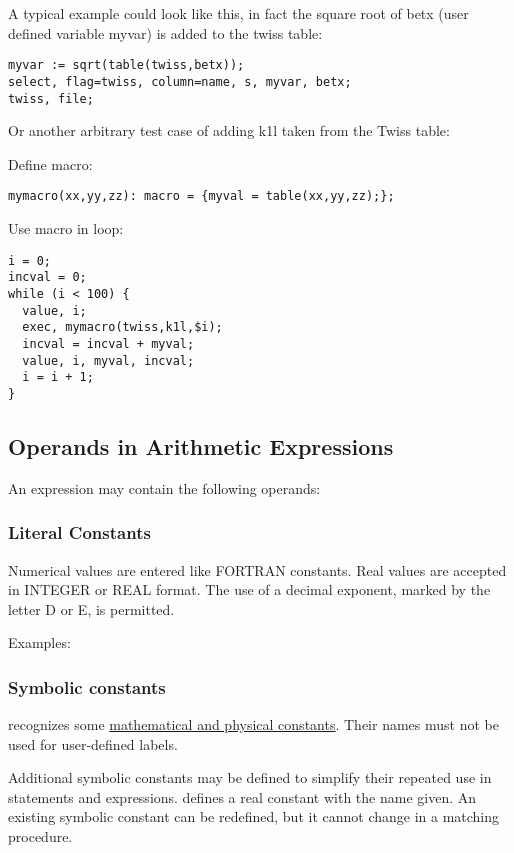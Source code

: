 A typical example could look like this, in fact the square root of betx
(user defined variable myvar) is added to the twiss table:  
\begin{verbatim}
myvar := sqrt(table(twiss,betx));
select, flag=twiss, column=name, s, myvar, betx;
twiss, file;
\end{verbatim}

Or another arbitrary test case of adding k1l taken from the Twiss table: 

Define macro: 
\begin{verbatim}
mymacro(xx,yy,zz): macro = {myval = table(xx,yy,zz);};
\end{verbatim}

Use macro in loop: 
\begin{verbatim}
i = 0;
incval = 0;
while (i < 100) {
  value, i;
  exec, mymacro(twiss,k1l,$i);
  incval = incval + myval;
  value, i, myval, incval;                
  i = i + 1;
}
\end{verbatim}

\subsection{Operands in Arithmetic Expressions}
\label{subsec:operand}
An expression may contain the following operands:  

\subsubsection{Literal Constants} 
Numerical values are entered like FORTRAN constants. Real values are
accepted in INTEGER or REAL format. The use of a decimal exponent,
marked by the letter D or E, is permitted.  

Examples: 

\subsubsection{Symbolic constants}
\label{subsubsec:symbolic_const}
\madx recognizes some \hyperref[tab-constants]{mathematical and physical
constants}. Their names must not be used for user-defined labels.  

Additional symbolic constants may be defined to simplify their repeated
use in statements and expressions.  
defines a real constant with the name given. An existing symbolic
constant can be redefined, but it cannot change in a matching procedure.  

